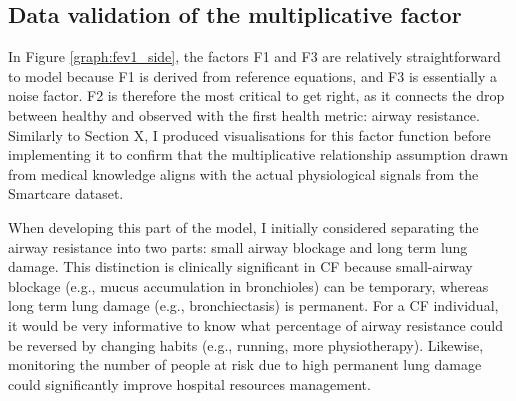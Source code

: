 
\subsection{Data validation of the multiplicative factor}

In Figure \ref{graph:fev1_side}, the factors F1 and F3 are relatively straightforward to model because F1 is derived from reference equations, and F3 is essentially a noise factor. F2 is therefore the most critical to get right, as it connects the drop between healthy and observed \F with the first health metric: airway resistance. Similarly to Section X, I produced visualisations for this factor function before implementing it to confirm that the multiplicative relationship assumption drawn from medical knowledge aligns with the actual physiological signals from the Smartcare dataset.

When developing this part of the model, I initially considered separating the airway resistance into two parts: small airway blockage and long term lung damage. This distinction is clinically significant in CF because small-airway blockage (e.g., mucus accumulation in bronchioles) can be temporary, whereas long term lung damage (e.g., bronchiectasis) is permanent. For a CF individual, it would be very informative to know what percentage of airway resistance could be reversed by changing habits (e.g., running, more physiotherapy). Likewise, monitoring the number of people at risk due to high permanent lung damage could significantly improve hospital resources management.

